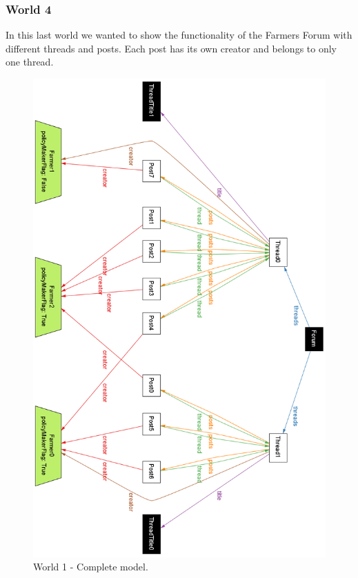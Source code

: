 \subsubsection{World 4}
In this last world we wanted to show the functionality of the Farmers Forum with different threads and posts. Each post has its own creator and belongs to only one thread.
\begin{figure}[H]
\centering
\includegraphics[scale=0.35]{../AlloyCode/ExportWorldPNG/world4_farmer_forum.png}
\caption{\label{fig:alloyExecution}World 1 - Complete model.}
\end{figure}
